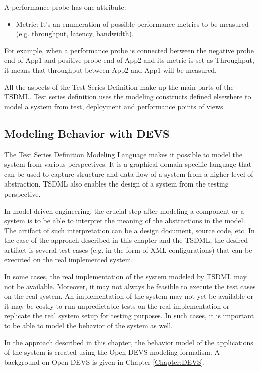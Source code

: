 A performance probe has one attribute:
\begin{itemize}
	\item Metric: It's an enumeration of possible performance metrics to be measured (e.g. throughput, latency, bandwidth).
\end{itemize}

For example, when a performance probe is connected between the negative probe end of App1 and positive probe end of App2 and its metric is set as Throughput, it means that throughput between App2 and App1 will be measured.

All the aspects of the Test Series Definition make up the main parts of the TSDML. Test series definition uses the modeling constructs defined elsewhere to model a system from test, deployment and performance points of views. 

\subsection{Modeling Behavior with DEVS}
The Test Series Definition Modeling Language makes it possible to model the system from various perspectives. It is a graphical domain specific language that can be used to capture structure and data flow of a system from a higher level of abstraction. TSDML also enables the design of a system from the testing perspective. 

In model driven engineering, the crucial step after modeling a component or a system is to be able to interpret the meaning of the abstractions in the model. The artifact of such interpretation can be a design document, source code, etc. In the case of the approach described in this chapter and the TSDML, the desired artifact is several test cases (e.g. in the form of XML configurations) that can be executed on the real implemented system. 

In some cases, the real implementation of the system modeled by TSDML may not be available. Moreover, it may not always be feasible to execute the test cases on the real system. An implementation of the system may not yet be available or it may be costly to run unpredictable tests on the real implementation or replicate the real system setup for testing purposes. In such cases, it is important to be able to model the behavior of the system as well. 

In the approach described in this chapter, the behavior model of the applications of the system is created using the Open DEVS modeling formalism. A background on Open DEVS is given in Chapter \ref{Chapter:DEVS}. 

